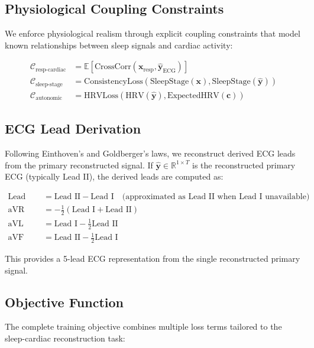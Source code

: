 \documentclass[11pt]{article}
\begin{document}
\subsection{Physiological Coupling Constraints}

We enforce physiological realism through explicit coupling constraints that model known relationships between sleep signals and cardiac activity:

\begin{align}
\mathcal{C}_{\text{resp-cardiac}} &= \mathbb{E}[\text{CrossCorr}(\mathbf{x}_{\text{resp}}, \hat{\mathbf{y}}_{\text{ECG}})] \\
\mathcal{C}_{\text{sleep-stage}} &= \text{ConsistencyLoss}(\text{SleepStage}(\mathbf{x}), \text{SleepStage}(\hat{\mathbf{y}})) \\
\mathcal{C}_{\text{autonomic}} &= \text{HRVLoss}(\text{HRV}(\hat{\mathbf{y}}), \text{ExpectedHRV}(\mathbf{c}))
\end{align}

\subsection{ECG Lead Derivation}

Following Einthoven's and Goldberger's laws, we reconstruct derived ECG leads from the primary reconstructed signal. If $\hat{\mathbf{y}} \in \mathbb{R}^{1 \times T}$ is the reconstructed primary ECG (typically Lead II), the derived leads are computed as:

\begin{align}
\text{Lead III} &= \text{Lead II} - \text{Lead I} \quad \text{(approximated as Lead II when Lead I unavailable)} \\
\text{aVR} &= -\frac{1}{2}(\text{Lead I} + \text{Lead II}) \\
\text{aVL} &= \text{Lead I} - \frac{1}{2}\text{Lead II} \\
\text{aVF} &= \text{Lead II} - \frac{1}{2}\text{Lead I}
\end{align}

This provides a 5-lead ECG representation from the single reconstructed primary signal.

\subsection{Objective Function}

The complete training objective combines multiple loss terms tailored to the sleep-cardiac reconstruction task:
\end{document}
